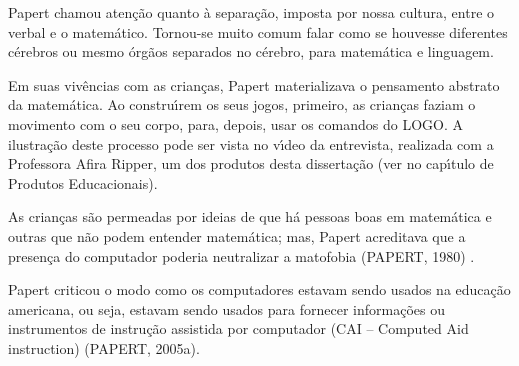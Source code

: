 \documentclass[
12pt,		%
openright,	%
twoside,  %
a4paper,			%
chapter=TITLE,		%
english,			%
french,				%
spanish,			%
brazil				%
]{USPSC-classe/USPSC}
\begin{document}
Papert chamou aten\c{c}\~ao quanto \`a separa\c{c}\~ao, imposta por nossa cultura, entre o verbal e o matem\'atico. Tornou-se muito comum falar como se houvesse diferentes c\'erebros ou mesmo \'org\~aos separados no c\'erebro, para matem\'atica e linguagem.

















Em suas viv\^encias com as crian\c{c}as, Papert materializava o pensamento abstrato da matem\'atica. Ao constru\'{\i}rem os seus jogos, primeiro, as crian\c{c}as faziam o movimento com o seu corpo, para, depois, usar os comandos do LOGO. A ilustra\c{c}\~ao deste processo pode ser vista no v\'{\i}deo  da entrevista, realizada com a Professora Afira Ripper,  um dos produtos desta disserta\c{c}\~ao (ver no cap\'{\i}tulo de Produtos Educacionais).

















As crian\c{c}as s\~ao permeadas por ideias de que h\'a pessoas boas em matem\'atica e outras que n\~ao podem entender matem\'atica; mas, Papert acreditava que a presen\c{c}a do computador poderia neutralizar a matofobia  (PAPERT, 1980) .

















Papert criticou o modo como os computadores estavam sendo usados na educa\c{c}\~ao americana, ou seja, estavam sendo usados para fornecer informa\c{c}\~oes ou instrumentos de instru\c{c}\~ao assistida por computador (CAI – Computed Aid instruction)  (PAPERT, 2005a).
\end{document}

